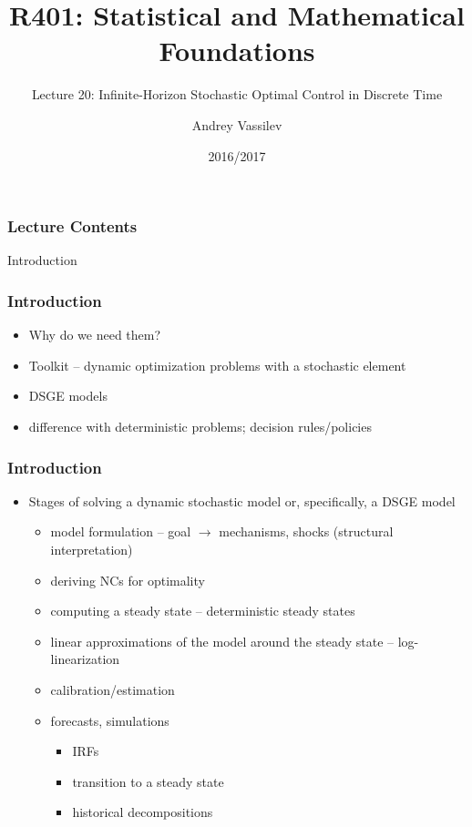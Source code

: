 \documentclass[10pt]{beamer}
\title{R401: Statistical and Mathematical Foundations}
\subtitle{Lecture 20: Infinite-Horizon Stochastic Optimal Control in Discrete Time}
\author{Andrey Vassilev}
\date{2016/2017}
\theoremstyle{definition}
\begin{document}
\maketitle



\begin{frame}[fragile]
\frametitle{Lecture Contents}
\tableofcontents
\end{frame}

\begin{section}{Introduction}\label{sec:intro}

\begin{frame}
\frametitle{Introduction}
\begin{itemize}
\item Why do we need them?
\item Toolkit -- dynamic optimization problems with a stochastic element
\item DSGE models
\item difference with deterministic problems; decision rules/policies 
\end{itemize}
\end{frame}


\begin{frame}
\frametitle{Introduction}
\begin{itemize}
\item Stages of solving a dynamic stochastic model or, specifically, a DSGE model
\begin{itemize}
  \item model formulation -- goal $\rightarrow$ mechanisms, shocks (structural interpretation)
  \item deriving NCs for optimality
  \item computing a steady state -- deterministic steady states 
  \item linear approximations of the model around the steady state -- log-linearization 
  \item calibration/estimation 
  \item forecasts, simulations
  \begin{itemize}
    \item IRFs 
    \item transition to a steady state
    \item historical decompositions
  \end{itemize}
\end{itemize}
\end{itemize}
\end{frame}




\end{section}
\end{document}
